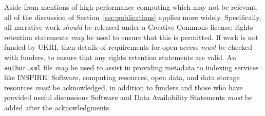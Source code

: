 \documentclass{article}
\newcommand\rfcword[1]{\emph{#1}\xspace}
\newcommand\must{\rfcword{must}}
\newcommand\should{\rfcword{should}}
\newcommand\may{\rfcword{may}}
\newcommand\filename[1]{\texttt{#1}\xspace}
\newcommand\authorxml{\filename{author.xml}}
\begin{document}
Aside from mentions of high-performance computing which may not be relevant,
all of the discussion of Section~\ref{sec:publications} applies more widely.
Specifically,
all narrative work \should be released under a Creative Commons license;
rights retention statements \may be used to ensure that this is permitted.
If work is not funded by UKRI,
then details of requirements for open access \must be checked with funders,
to ensure that any rights retention statements are valid.
An \authorxml file \may be used
to assist in providing metadata to indexing services like INSPIRE\@.
Software,
computing resources,
open data,
and data storage resources \must be acknowledged,
in addition to funders and those who have provided useful discussions
Software and Data Availability Statements \must be added after the acknowledgments.
\end{document}
